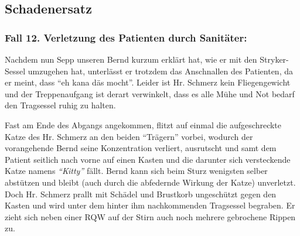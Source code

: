 
\subsection{Schadenersatz}
\label{topic:schadenersatz}

\subsubsection{Fall 12. Verletzung des Patienten durch
Sanitäter:}
\label{topic:jus-langer-dienst-fall-12}



{Nachdem nun Sepp unseren Bernd kurzum erklärt hat, wie er
mit den Stryker{\texttrademark}-Sessel umzugehen hat,
unterlässt er trotzdem das Anschnallen des Patienten, da er
meint, dass \enquote{eh kana däs mocht}. Leider ist Hr.
Schmerz kein Fliegengewicht und der Treppenaufgang ist
derart verwinkelt, dass es alle Mühe und Not bedarf den
Tragsessel ruhig zu halten.

Fast am Ende des Abgangs angekommen, flitzt auf einmal die
aufgeschreckte Katze des Hr. Schmerz an den beiden
\enquote{Trägern} vorbei, wodurch der vorangehende Bernd
seine Konzentration verliert, ausrutscht und samt dem
Patient seitlich nach vorne auf einen Kasten und die
darunter sich versteckende Katze namens
\emph{\enquote{Kitty}} %
fällt. Bernd kann sich beim Sturz wenigsten selber abstützen
und bleibt (auch durch die abfedernde Wirkung der Katze)
unverletzt. Doch Hr. Schmerz prallt mit Schädel und
Brustkorb ungeschützt gegen den Kasten und wird unter dem
hinter ihm nachkommenden Tragsessel begraben. Er zieht sich
neben einer RQW auf
der Stirn auch noch mehrere gebrochene Rippen zu.
}{}{}{}{}

